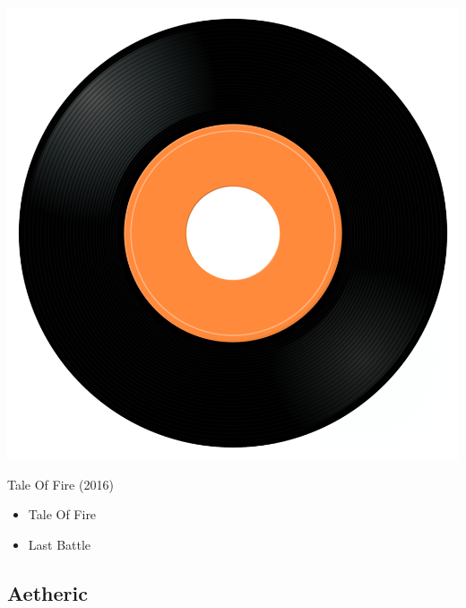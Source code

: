 \begin{minipage}[t]{0.25\textwidth}\vspace{0pt}
\captionsetup{type=figure}
\includegraphics[width=\textwidth]{Images/cover.png}
\caption*{Tale Of Fire (2016)}
\end{minipage}
\begin{minipage}[t]{0.25\textwidth}\vspace{0pt}
\begin{itemize}[nosep,leftmargin=1em,labelwidth=*,align=left]
	\setlength{\itemsep}{0pt}
	\item Tale Of Fire
	\item Last Battle
\end{itemize}
\end{minipage}

\subsection{Aetheric}

